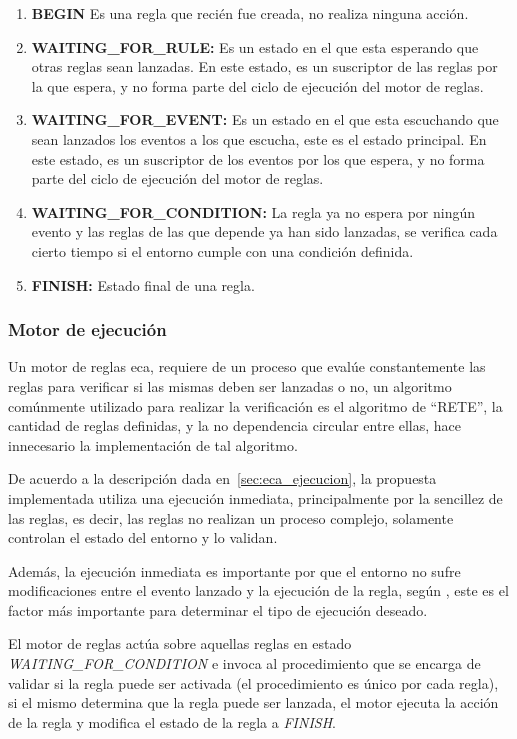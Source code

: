 \begin{enumerate}
\item \textbf{BEGIN} Es una regla que recién fue creada, no realiza ninguna
	acción.
\item \textbf{WAITING\_FOR\_RULE:} Es un estado en el que esta esperando que otras reglas
	sean lanzadas. En este estado, es un suscriptor de las reglas por la que
	espera, y no forma parte del ciclo de ejecución del motor de reglas.
\item \textbf{WAITING\_FOR\_EVENT:} Es un estado en el que esta escuchando que sean
	lanzados los eventos a los que escucha, este es el estado principal. En
	este estado, es un suscriptor de los eventos por los que espera, y no
	forma parte del ciclo de ejecución del motor de reglas.
\item \textbf{WAITING\_FOR\_CONDITION:} La regla ya no espera por ningún evento y las
	reglas de las que depende ya han sido lanzadas, se verifica cada cierto
	tiempo si el entorno cumple con una condición definida. 
\item \textbf{FINISH:} Estado final de una regla.
\end{enumerate}


\subsubsection{Motor de ejecución}

Un motor de reglas \gls{eca}, requiere de un proceso que evalúe constantemente
las reglas para verificar si las mismas deben ser lanzadas o
no\cite{bailey2004event,galton2002two}, un algoritmo comúnmente utilizado para
realizar la verificación es el algoritmo de \enquote{RETE}\cite{de2001eca}, la cantidad de
reglas definidas, y la no dependencia circular entre ellas, hace innecesario la
implementación de tal algoritmo\cite{de2001eca}. 

De acuerdo a la descripción dada en~\ref{sec:eca_ejecucion}, la propuesta
implementada utiliza una ejecución inmediata, principalmente por la sencillez
de las reglas, es decir, las reglas no realizan un proceso complejo, solamente
controlan el estado del entorno y lo validan.

Además, la ejecución inmediata es importante por que el entorno no sufre
modificaciones entre el evento lanzado y la ejecución de la regla, según
\cite{bailey2004event}, este es el factor más importante para determinar el tipo
de ejecución deseado.

El motor de reglas actúa sobre aquellas reglas en estado
\emph{WAITING\_FOR\_CONDITION} e invoca al procedimiento que se encarga de
validar si la regla puede ser activada (el procedimiento es único por cada
regla), si el mismo determina que la regla puede ser lanzada, el motor ejecuta
la acción de la regla y modifica el estado de la regla a \emph{FINISH}.

